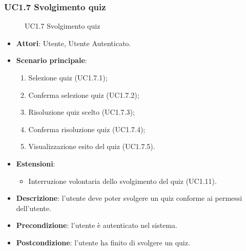 \subsubsection{UC1.7 Svolgimento quiz}
\begin{figure}[H]
\centering
\noindent{}
\caption{UC1.7 Svolgimento quiz}
\end{figure}
\begin{itemize}
\item \textbf{Attori}: Utente, Utente Autenticato.
\item \textbf{Scenario principale}:
\begin{enumerate}
\item Selezione quiz (UC1.7.1);
\item Conferma selezione quiz (UC1.7.2);
\item Risoluzione quiz scelto (UC1.7.3);
\item Conferma risoluzione quiz (UC1.7.4);
\item Visualizzazione esito del quiz (UC1.7.5).
\end{enumerate}
\item \textbf{Estensioni}:
\begin{itemize}
\item Interruzione volontaria dello svolgimento del quiz (UC1.11).
\end{itemize}
\item \textbf{Descrizione}: l'utente deve poter svolgere un quiz conforme ai permessi dell'utente.
\item \textbf{Precondizione}: l'utente è autenticato nel sistema.
\item \textbf{Postcondizione}: l'utente ha finito di svolgere un quiz.
\end{itemize}
